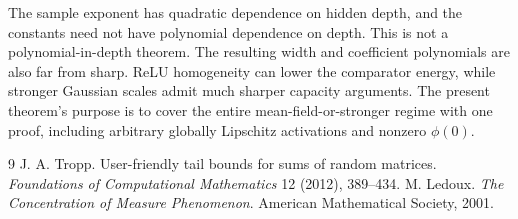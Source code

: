 \documentclass[11pt]{article}
\theoremstyle{remark}\newtheorem{remark}[theorem]{Remark}
\begin{document}
The sample exponent has quadratic dependence on hidden depth, and the constants need not have polynomial dependence on depth. This is not a polynomial-in-depth theorem. The resulting width and coefficient polynomials are also far from sharp. ReLU homogeneity can lower the comparator energy, while stronger Gaussian scales admit much sharper capacity arguments. The present theorem's purpose is to cover the entire mean-field-or-stronger regime with one proof, including arbitrary globally Lipschitz activations and nonzero $\phi(0)$.



\begin{thebibliography}{9}
J. A. Tropp. User-friendly tail bounds for sums of random matrices.
\emph{Foundations of Computational Mathematics} 12 (2012), 389--434.
M. Ledoux. \emph{The Concentration of Measure Phenomenon}.
American Mathematical Society, 2001.
\end{thebibliography}
\end{document}
